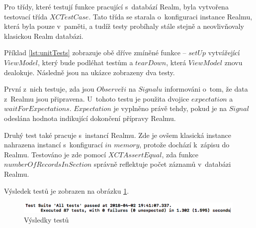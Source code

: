 \documentclass[thesis=M,czech]{FITthesis}[2012/06/26]
\begin{document}
Pro třídy, které testují funkce pracující s~databází Realm, byla vytvořena testovací třída $XCTestCase$. Tato třída se starala o~konfiguraci instance Realmu, která byla pouze v~paměti, a tudíž testy probíhaly stále stejně a neovlivňovaly klasickou Realm databázi.

Příklad \ref{lst:unitTests} zobrazuje obě dříve zmíněné funkce -- $setUp$ vytvářející $ViewModel$, který bude podléhat testům a $tearDown$, která $ViewModel$ znovu dealokuje. Následně jsou na ukázce zobrazeny dva testy. 

První z~nich testuje, zda jsou $Observeři$ na $Signalu$ informováni o~tom, že data z~Realmu jsou připravena. U~tohoto testu je použita dvojice $expectation$ a $waitForExpectations$. $Expectation$ je vyplněno právě tehdy, pokud je na $Signal$ odeslána hodnota indikující dokončení přípravy Realmu. 

Druhý test také pracuje s~instancí Realmu. Zde je ovšem klasická instance nahrazena instancí s~konfigurací $in$ $memory$, protože dochází k~zápisu do Realmu. Testováno je zde pomocí $XCTAssertEqual$, zda funkce $numberOfRecordsInSection$ správně reflektuje počet záznamů v~databázi Realmu.

Výsledek testů je zobrazen na obrázku \ref{fig:testsResult}.

\begin{figure}[]\centering
 \includegraphics[width=0.99\textwidth]{./pictures/tests}
 \caption[Výsledky testů]{Výsledky testů}\label{fig:testsResult}
\end{figure}
\end{document}

